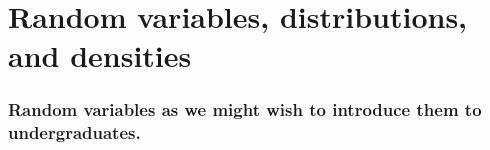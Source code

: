 

\part*{Random variables, distributions, and densities}%

\section{Random variables as we might wish to introduce them to
  undergraduates.}

